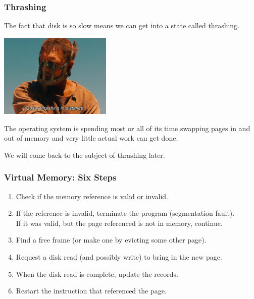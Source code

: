 \begin{frame}
\frametitle{Thrashing}

The fact that disk is so slow means we can get into a state called \alert{thrashing}. 

\begin{center}
	\includegraphics[width=0.4\textwidth]{images/thrashing2.png}
\end{center}

The operating system is spending most or all of its time swapping pages in and out of memory and very little actual work can get done.

We will come back to the subject of thrashing later.

\end{frame}

\begin{frame}
\frametitle{Virtual Memory: Six Steps}

\begin{enumerate}
	\item Check if the memory reference is valid or invalid.
	\item If the reference is invalid, terminate the program (segmentation fault).\\
	 If it was valid, but the page referenced is not in memory, continue.
	\item Find a free frame (or make one by evicting some other page).
	\item Request a disk read (and possibly write) to bring in the new page.
	\item When the disk read is complete, update the records.
	\item Restart the instruction that referenced the page.
\end{enumerate}


\end{frame}

